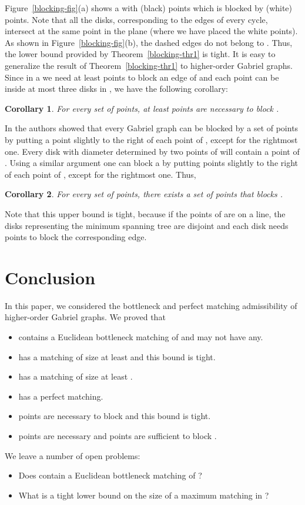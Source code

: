 \documentclass[11pt,a4paper]{article}
\newcommand{\kGG}[2]{}
\newtheorem{corollary}{Corollary}
\begin{document}
Figure~\ref{blocking-fig}(a) shows a \kGG{0}{} with  (black) points which is blocked by  (white) points. Note that all the disks, corresponding to the edges of every cycle, intersect at the same point in the plane (where we have placed the white points). As shown in Figure~\ref{blocking-fig}(b), the dashed edges do not belong to \kGG{0}{}. Thus, the lower bound provided by Theorem~\ref{blocking-thr1} is tight. It is easy to generalize the result of Theorem~\ref{blocking-thr1} to higher-order Gabriel graphs. Since in a \kGG{k}{} we need at least  points to block an edge of  and each point can be inside at most three disks in , we have the following corollary:

\begin{corollary}
For every set  of  points, at least  points are necessary to block \kGG{k}{(P)}.
\end{corollary}

In \cite{Aronov2013} the authors showed that every Gabriel graph can be blocked by a set  of  points by putting a point slightly to the right of each point of , except for the rightmost one. Every disk with diameter determined by two points of  will contain a point of . Using a similar argument one can block a \kGG{k}{} by putting  points slightly to the right of each point of , except for the rightmost one. Thus,

\begin{corollary}
 For every set  of  points, there exists a set of  points that blocks \kGG{k}{(P)}.
\end{corollary}

Note that this upper bound is tight, because if the points of  are on a line, the disks representing the minimum spanning tree are disjoint and each disk needs  points to block the corresponding edge.

\section{Conclusion}
\label{conclusion}
In this paper, we considered the bottleneck and perfect matching admissibility of higher-order Gabriel graphs. We proved that
\begin{itemize}
  \item \kGG{10}{} contains a Euclidean bottleneck matching of  and \kGG{8}{} may not have any.
  \item \kGG{0}{} has a matching of size at least  and this bound is tight.
  \item \kGG{1}{} has a matching of size at least .
  \item \kGG{2}{} has a perfect matching.
    \item  points are necessary to block \kGG{0}{} and this bound is tight.
  \item  points are necessary and  points are sufficient to block \kGG{k}{}.
\end{itemize}
We leave a number of open problems:
\begin{itemize}
  \item Does \kGG{9}{} contain a Euclidean bottleneck matching of ?
  \item What is a tight lower bound on the size of a maximum matching in \kGG{1}{}?
\end{itemize}



\end{document}
